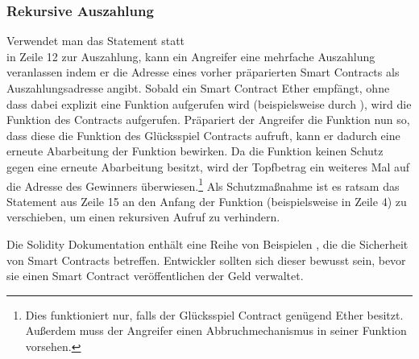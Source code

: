 \subsubsection{Rekursive Auszahlung}
Verwendet man das Statement  statt\\  in Zeile 12 zur Auszahlung, kann ein Angreifer eine mehrfache Auszahlung veranlassen indem er die Adresse eines vorher präparierten Smart Contracts als Auszahlungsadresse angibt. Sobald ein Smart Contract Ether empfängt, ohne dass dabei explizit eine Funktion aufgerufen wird (beispielsweise durch ), wird die  Funktion des Contracts aufgerufen. Präpariert der Angreifer die  Funktion nun so, dass diese die  Funktion des Glücksspiel Contracts aufruft, kann er dadurch eine erneute Abarbeitung der  Funktion bewirken. Da die  Funktion keinen Schutz gegen eine erneute Abarbeitung besitzt, wird der Topfbetrag ein weiteres Mal auf die Adresse des Gewinners überwiesen.\footnote{Dies funktioniert nur, falls der Glücksspiel Contract genügend Ether besitzt. Außerdem muss der Angreifer einen Abbruchmechanismus in seiner  Funktion vorsehen.} Als Schutzmaßnahme ist es ratsam das Statement  aus Zeile 15 an den Anfang der Funktion (beispielsweise in Zeile 4) zu verschieben, um einen rekursiven Aufruf zu verhindern. 

Die Solidity Dokumentation enthält eine Reihe von Beispielen \cite{solidity_security}, die die Sicherheit von Smart Contracts betreffen. Entwickler sollten sich dieser bewusst sein, bevor sie einen Smart Contract veröffentlichen der Geld verwaltet.


